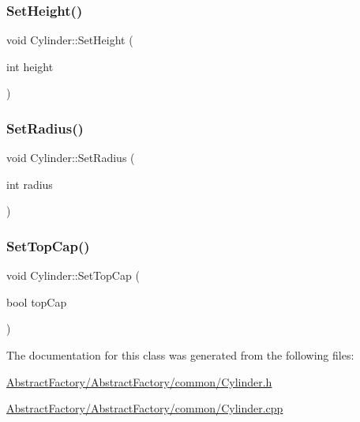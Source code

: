 \mbox{\label{class_cylinder_a269bbf0d359b586a9f0bd214e26109f4}} 
\subsubsection{\texorpdfstring{SetHeight()}{SetHeight()}}
{\footnotesize\ttfamily void Cylinder\+::\+Set\+Height (\begin{DoxyParamCaption}\item[{int}]{height }\end{DoxyParamCaption})}

\mbox{\label{class_cylinder_a6154587e13ab550cf3542188231957c5}} 
\subsubsection{\texorpdfstring{SetRadius()}{SetRadius()}}
{\footnotesize\ttfamily void Cylinder\+::\+Set\+Radius (\begin{DoxyParamCaption}\item[{int}]{radius }\end{DoxyParamCaption})}

\mbox{\label{class_cylinder_a7c0f84cbfad4dda30a663a48858c70ea}} 
\subsubsection{\texorpdfstring{SetTopCap()}{SetTopCap()}}
{\footnotesize\ttfamily void Cylinder\+::\+Set\+Top\+Cap (\begin{DoxyParamCaption}\item[{bool}]{top\+Cap }\end{DoxyParamCaption})}



The documentation for this class was generated from the following files\+:\begin{DoxyCompactItemize}
\item 
\mbox{\hyperlink{_abstract_factory_2_abstract_factory_2common_2_cylinder_8h}{Abstract\+Factory/\+Abstract\+Factory/common/\+Cylinder.\+h}}\item 
\mbox{\hyperlink{_abstract_factory_2_abstract_factory_2common_2_cylinder_8cpp}{Abstract\+Factory/\+Abstract\+Factory/common/\+Cylinder.\+cpp}}\end{DoxyCompactItemize}
